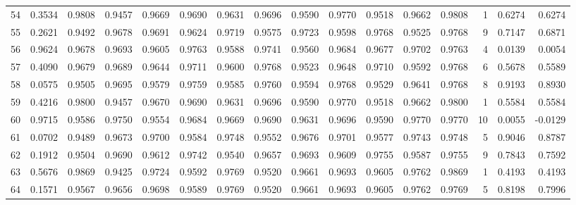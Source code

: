 \begin{tabular}{lrrrrrrrrrrrrrrr}
54  &      0.3534 &  0.9808 &  0.9457 &  0.9669 &  0.9690 &  0.9631 &  0.9696 &  0.9590 &  0.9770 &  0.9518 &   0.9662 &     0.9808 &      1 &                    0.6274 &                     0.6274 \\
55  &      0.2621 &  0.9492 &  0.9678 &  0.9691 &  0.9624 &  0.9719 &  0.9575 &  0.9723 &  0.9598 &  0.9768 &   0.9525 &     0.9768 &      9 &                    0.7147 &                     0.6871 \\
56  &      0.9624 &  0.9678 &  0.9693 &  0.9605 &  0.9763 &  0.9588 &  0.9741 &  0.9560 &  0.9684 &  0.9677 &   0.9702 &     0.9763 &      4 &                    0.0139 &                     0.0054 \\
57  &      0.4090 &  0.9679 &  0.9689 &  0.9644 &  0.9711 &  0.9600 &  0.9768 &  0.9523 &  0.9648 &  0.9710 &   0.9592 &     0.9768 &      6 &                    0.5678 &                     0.5589 \\
58  &      0.0575 &  0.9505 &  0.9695 &  0.9579 &  0.9759 &  0.9585 &  0.9760 &  0.9594 &  0.9768 &  0.9529 &   0.9641 &     0.9768 &      8 &                    0.9193 &                     0.8930 \\
59  &      0.4216 &  0.9800 &  0.9457 &  0.9670 &  0.9690 &  0.9631 &  0.9696 &  0.9590 &  0.9770 &  0.9518 &   0.9662 &     0.9800 &      1 &                    0.5584 &                     0.5584 \\
60  &      0.9715 &  0.9586 &  0.9750 &  0.9554 &  0.9684 &  0.9669 &  0.9690 &  0.9631 &  0.9696 &  0.9590 &   0.9770 &     0.9770 &     10 &                    0.0055 &                    -0.0129 \\
61  &      0.0702 &  0.9489 &  0.9673 &  0.9700 &  0.9584 &  0.9748 &  0.9552 &  0.9676 &  0.9701 &  0.9577 &   0.9743 &     0.9748 &      5 &                    0.9046 &                     0.8787 \\
62  &      0.1912 &  0.9504 &  0.9690 &  0.9612 &  0.9742 &  0.9540 &  0.9657 &  0.9693 &  0.9609 &  0.9755 &   0.9587 &     0.9755 &      9 &                    0.7843 &                     0.7592 \\
63  &      0.5676 &  0.9869 &  0.9425 &  0.9724 &  0.9592 &  0.9769 &  0.9520 &  0.9661 &  0.9693 &  0.9605 &   0.9762 &     0.9869 &      1 &                    0.4193 &                     0.4193 \\
64  &      0.1571 &  0.9567 &  0.9656 &  0.9698 &  0.9589 &  0.9769 &  0.9520 &  0.9661 &  0.9693 &  0.9605 &   0.9762 &     0.9769 &      5 &                    0.8198 &                     0.7996 \\

\end{tabular}
